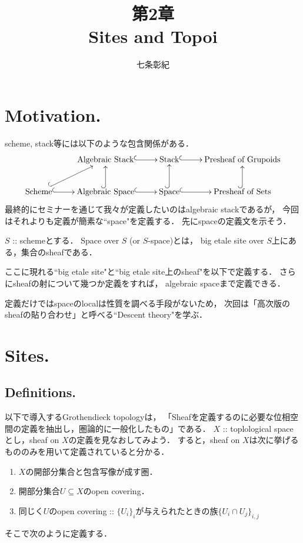 \documentclass[a4paper, dvipdfmx]{jsarticle}
\begin{document}
\title{第2章 \\ Sites and Topoi}
\author{七条彰紀}
\maketitle
\tableofcontents
\vspace{10pt}

\section{Motivation.}
scheme, stack等には以下のような包含関係がある．
\[\xymatrix{
    {} & \text{Algebraic Stack} \ar@{^{(}->}[r]& \text{Stack} \ar@{^{(}->}[r]& \text{Presheaf of Grupoids} \\
    \text{Scheme} \ar@{^{(}->}[r]\ar@{^{(}->}[ru]& \text{Algebraic Space} \ar@{^{(}->}[r]\ar@{^{(}->}[u]&
        \text{Space} \ar@{^{(}->}[r]\ar@{^{(}->}[u]& \text{Presheaf of Sets} \ar@{^{(}->}[u]
}\]
最終的にセミナーを通じて我々が定義したいのはalgebraic stackであるが，
今回はそれよりも定義が簡素な``space"を定義する．
先にspaceの定義文を示そう．

\begin{Def}
    $S$ :: schemeとする．
    Space over $S$ (or $S$-space)とは，
    big etale site over $S$上にある，集合のsheafである．
\end{Def}
ここに現れる``big etale site"と``big etale site上のsheaf"を以下で定義する．
さらにsheafの射について幾つか定義をすれば，
algebraic spaceまで定義できる．

定義だけではspaceのlocalは性質を調べる手段がないため，
次回は「高次版のsheafの貼り合わせ」と呼べる``Descent theory"を学ぶ．

\section{Sites.}

\subsection{Definitions.}
以下で導入するGrothendieck topologyは，
「Sheafを定義するのに必要な位相空間の定義を抽出し，圏論的に一般化したもの」である．
$X$ :: toplological spaceとし，sheaf on $X$の定義を見なおしてみよう．
すると，sheaf on  $X$は次に挙げるもののみを用いて定義されていると分かる．
\begin{enumerate}
    \item $X$の開部分集合と包含写像が成す圏．
    \item 開部分集合$U \subseteq X$のopen covering．
    \item 同じく$U$のopen covering :: $\{U_i\}_i$が与えられたときの族$\{ U_i \cap U_j \}_{i,j}$
\end{enumerate}
そこで次のように定義する．
\end{document}
